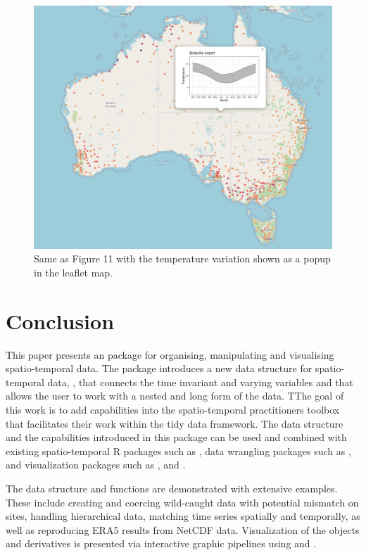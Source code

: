 \documentclass[
]{jss}
\begin{document}
\begin{CodeChunk}
\begin{figure}

{\centering \includegraphics[width=0.45\linewidth,height=0.25\textheight]{../figures/popup-mid} 

}

\caption[Same as Figure 11 with the temperature variation shown as a popup in the leaflet map]{Same as Figure 11 with the temperature variation shown as a popup in the leaflet map.}\label{fig:interactive-popup}
\end{figure}
\end{CodeChunk}

\hypertarget{conclude}{%
\section{Conclusion}\label{conclude}}

This paper presents an  package  for organising, manipulating and visualising spatio-temporal data. The package introduces a new data structure for spatio-temporal data, , that connects the time invariant and varying variables and that allows the user to work with a nested and long form of the data. TThe goal of this work is to add capabilities into the spatio-temporal practitioners toolbox that facilitates their work within the tidy data framework. The data structure and the capabilities introduced in this package can be used and combined with existing spatio-temporal R packages such as , data wrangling packages such as , and visualization packages such as ,  and .

The data structure and functions are demonstrated with extensive examples. These include creating and coercing wild-caught data with potential mismatch on sites, handling hierarchical data, matching time series spatially and temporally, as well as reproducing ERA5 results from NetCDF data. Visualization of the  objects and derivatives is presented via interactive graphic pipelines using  and .
\end{document}
